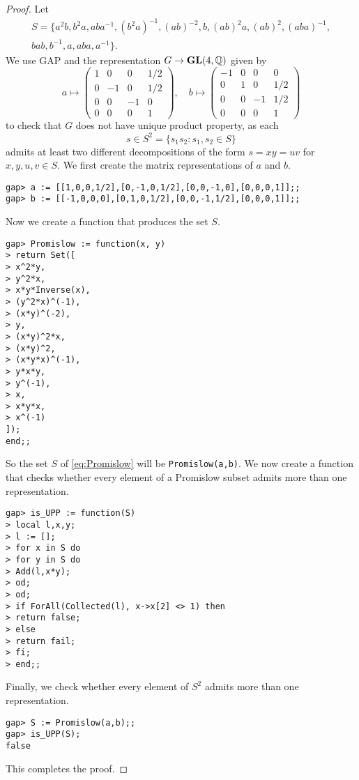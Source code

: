 \begin{proof}
    Let 
    \begin{multline}
    \label{eq:Promislow}
    S=\{ a^2b,
    b^2a,
    aba^{-1},
    (b^2a)^{-1},
    (ab)^{-2},
    b,
    (ab)^2a,
    (ab)^2,
    (aba)^{-1},\\
    bab,
    b^{-1},
    a,
    aba,
    a^{-1}
    \}.
    \end{multline}
    We use \textsf{GAP} and the representation $G\to\mathbf{GL}(4,\mathbb{Q})$ given by 
    \[
a\mapsto\begin{pmatrix}
1 & 0 & 0 & 1/2\\
0 & -1 & 0 & 1/2\\
0 & 0 & -1 & 0\\
0 & 0 & 0 & 1
\end{pmatrix},
\quad
b\mapsto\begin{pmatrix}
-1 & 0 & 0 & 0\\
0 & 1 & 0 & 1/2\\
0 & 0 & -1 & 1/2\\
0 & 0 & 0 & 1
\end{pmatrix}
\]
    to check that 
    $G$ does not have
    unique product property, as each 
    \[
    s\in S^2=\{s_1s_2:s_1,s_2\in S\}
    \]
    admits at least two different decompositions of the 
    form $s=xy=uv$ for $x,y,u,v\in S$. 
    We first create the matrix representations of $a$ and $b$.
\begin{lstlisting}
gap> a := [[1,0,0,1/2],[0,-1,0,1/2],[0,0,-1,0],[0,0,0,1]];;
gap> b := [[-1,0,0,0],[0,1,0,1/2],[0,0,-1,1/2],[0,0,0,1]];;
\end{lstlisting}
    Now we create
    a function that produces the set $S$.
\begin{lstlisting}
gap> Promislow := function(x, y)
> return Set([
> x^2*y,
> y^2*x,
> x*y*Inverse(x),
> (y^2*x)^(-1),
> (x*y)^(-2),
> y,
> (x*y)^2*x,
> (x*y)^2,
> (x*y*x)^(-1),
> y*x*y,
> y^(-1),
> x,
> x*y*x,
> x^(-1)
]);
end;;
\end{lstlisting}
So the set $S$ of \eqref{eq:Promislow} 
will be \lstinline{Promislow(a,b)}. We now
create a function that checks whether
every element of a Promislow subset 
admits more than one representation.
\begin{lstlisting}
gap> is_UPP := function(S)
> local l,x,y;
> l := [];
> for x in S do
> for y in S do
> Add(l,x*y);
> od;
> od;
> if ForAll(Collected(l), x->x[2] <> 1) then
> return false;
> else
> return fail;
> fi;
> end;;
\end{lstlisting}
Finally, we check whether every element of 
$S^2$ admits more than one representation.
\begin{lstlisting}
gap> S := Promislow(a,b);;
gap> is_UPP(S);
false
\end{lstlisting}
This completes the proof. 
\end{proof}

